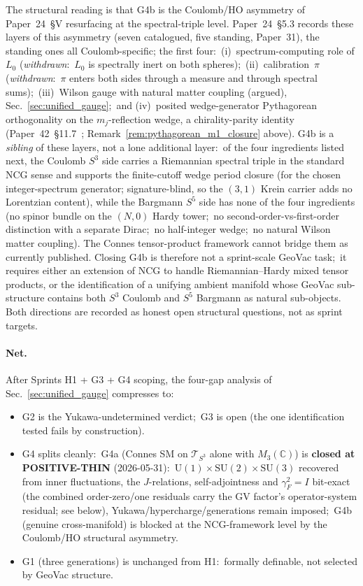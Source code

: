 \documentclass[11pt]{article}
\begin{document}
The structural reading is that G4b is the Coulomb/HO
asymmetry of Paper~24~\S V resurfacing at the spectral-triple level.
Paper~24~\S 5.3 records these layers of this asymmetry (seven
catalogued, five standing, Paper~31), the standing ones all
Coulomb-specific; the first four:\ (i)~spectrum-computing role of
$L_0$ (\emph{withdrawn}:\ $L_0$ is spectrally inert on both
spheres);\ (ii)~calibration~$\pi$ (\emph{withdrawn}:\ $\pi$ enters
both sides through a measure and through spectral sums);\ (iii)~Wilson gauge with natural matter
coupling (argued), Sec.~\ref{sec:unified_gauge};\ and (iv)~posited wedge-generator
Pythagorean orthogonality on the $m_j$-reflection wedge, a
chirality-parity identity (Paper~42~\S 11.7~\cite{paper42};
Remark~\ref{rem:pythagorean_m1_closure} above).  G4b is a
\emph{sibling} of these layers, not a lone additional layer:\ of the
four ingredients listed next, the Coulomb $S^3$ side carries a Riemannian spectral triple in the
standard NCG sense and supports the finite-cutoff wedge period
closure (for the chosen integer-spectrum generator; signature-blind,
so the $(3,1)$ Krein carrier adds no Lorentzian content), while the Bargmann
$S^5$ side has none of the four ingredients (no spinor bundle on
the $(N, 0)$ Hardy tower;\ no second-order-vs-first-order distinction
with a separate Dirac;\ no half-integer wedge;\ no natural Wilson
matter coupling). The Connes tensor-product
framework cannot bridge them as currently published.  Closing G4b is
therefore not a sprint-scale GeoVac task;\ it requires either an
extension of NCG to handle Riemannian--Hardy mixed tensor products,
or the identification of a unifying ambient manifold whose GeoVac
sub-structure contains both $S^3$ Coulomb and $S^5$ Bargmann as
natural sub-objects.  Both directions are recorded as honest open
structural questions, not as sprint targets.

\paragraph{Net.}  After Sprints H1 + G3 + G4 scoping, the
four-gap analysis of Sec.~\ref{sec:unified_gauge} compresses to:

\begin{itemize}\setlength{\itemsep}{2pt}
\item G2 is the Yukawa-undetermined verdict;\ G3 is open (the one
identification tested fails by construction).
\item G4 splits cleanly:\ G4a (Connes SM on $\mathcal{T}_{S^3}$
alone with $M_3(\mathbb{C})$) is \textbf{closed at POSITIVE-THIN}
(2026-05-31):\ $\mathrm{U}(1) \times \mathrm{SU}(2) \times
\mathrm{SU}(3)$ recovered from inner fluctuations, the $J$-relations,
self-adjointness and $\gamma_F^2 = I$ bit-exact (the combined
order-zero/one residuals carry the GV factor's operator-system
residual; see below), Yukawa/hypercharge/generations remain imposed;\ G4b
(genuine cross-manifold) is blocked at the NCG-framework level by the
Coulomb/HO structural asymmetry.
\item G1 (three generations) is unchanged from H1:\ formally
definable, not selected by GeoVac structure.
\end{itemize}
\end{document}
